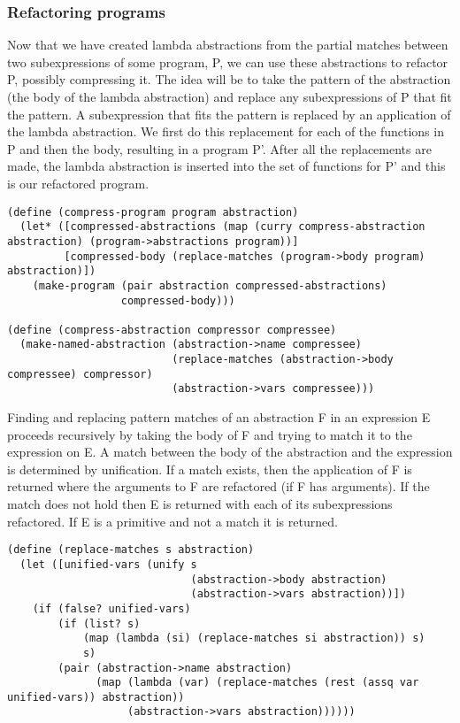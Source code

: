 \documentclass[a4paper,10pt]{article}
\begin{document}
\subsubsection{Refactoring programs}
Now that we have created lambda abstractions from the partial matches between two subexpressions of some program, P, we can use these abstractions to refactor P, possibly compressing it.  The idea will be to take the pattern of the abstraction (the body of the lambda abstraction) and replace any subexpressions of P that fit the pattern.  A subexpression that fits the pattern is replaced by an application of the lambda abstraction.  We first do this replacement for each of the functions in P and then the body, resulting in a program P'.  After all the replacements are made, the lambda abstraction is inserted into the set of functions for P' and this is our refactored program.
\begin{lstlisting}[frame=trBL]
(define (compress-program program abstraction)
  (let* ([compressed-abstractions (map (curry compress-abstraction abstraction) (program->abstractions program))]
         [compressed-body (replace-matches (program->body program) abstraction)])
    (make-program (pair abstraction compressed-abstractions)
                  compressed-body)))

(define (compress-abstraction compressor compressee)
  (make-named-abstraction (abstraction->name compressee)
                          (replace-matches (abstraction->body compressee) compressor)
                          (abstraction->vars compressee)))                           
\end{lstlisting}
Finding and replacing pattern matches of an abstraction F in an expression E proceeds recursively by taking the body of F and trying to match it to the expression on E.  A match between the body of the abstraction and the expression is determined by unification. If a match exists, then the application of F is returned where the arguments to F are refactored (if F has arguments).  If the match does not hold then E is returned with each of its subexpressions refactored.  If E is a primitive and not a match it is returned.

\begin{lstlisting}[frame=trBL]
(define (replace-matches s abstraction)
  (let ([unified-vars (unify s
                             (abstraction->body abstraction)
                             (abstraction->vars abstraction))])
    (if (false? unified-vars)
        (if (list? s)
            (map (lambda (si) (replace-matches si abstraction)) s)
            s)
        (pair (abstraction->name abstraction)
              (map (lambda (var) (replace-matches (rest (assq var unified-vars)) abstraction))
                   (abstraction->vars abstraction))))))
\end{lstlisting}
\end{document}
